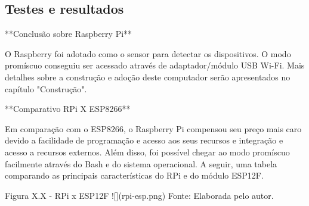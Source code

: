 \subsection{Testes e resultados}
\label{subsec:mercado-esp}



**Conclusão sobre Raspberry Pi**

O Raspberry foi adotado como o sensor para detectar os dispositivos. O modo
promíscuo conseguiu ser acessado através de adaptador/módulo USB Wi-Fi. Mais
detalhes sobre a construção e adoção deste computador serão apresentados no
capítulo "Construção".

**Comparativo RPi X ESP8266**

Em comparação com o ESP8266, o Raspberry Pi compensou seu preço mais caro devido
a facilidade de programação e acesso aos seus recursos e integração e acesso a
recursos externos. Além disso, foi possível chegar ao modo promíscuo facilmente
através do Bash e do sistema operacional. A seguir, uma tabela comparando as
principais características do RPi e do módulo ESP12F.

Figura X.X - RPi x ESP12F
![](rpi-esp.png)
Fonte: Elaborada pelo autor.

